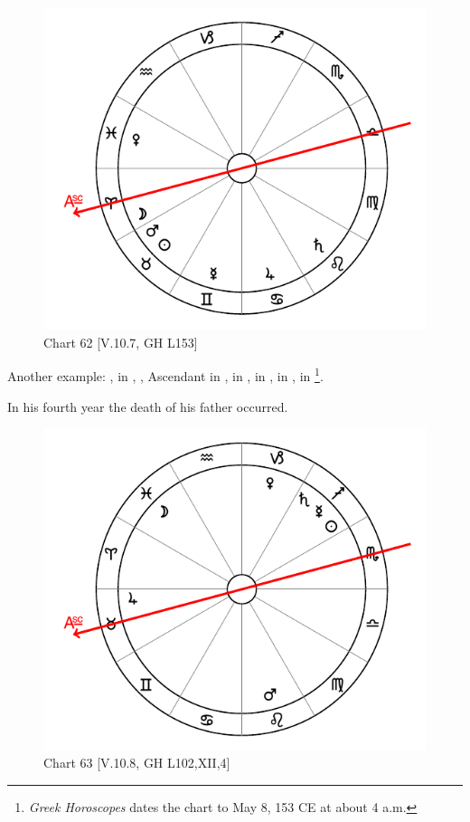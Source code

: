 \newpage
\begin{figure}
\centering
\vspace{-20pt}
\includegraphics[width=.68\textwidth]{charts/5_10_07}
\caption{Chart 62 [V.10.7, GH L153]}
\label{fig:chart62}
\end{figure}

\noindent Another example: \Sun, \Mars\xspace in \Taurus, \Moon, Ascendant in \Aries, \Saturn\xspace in \Leo, \Jupiter\xspace in \Cancer, \Venus\xspace in \Pisces, \Mercury\xspace in \Gemini\footnote{\textit{Greek Horoscopes} dates the chart to May 8, 153 CE at about 4 a.m.}. 

In his fourth year the death of his father occurred.

\vspace{1.2cm}

\begin{figure}
\centering
\vspace{-20pt}
\includegraphics[width=.68\textwidth]{charts/5_10_08}
\caption{Chart 63 [V.10.8, GH L102,XII,4]}
\label{fig:chart63}
\end{figure}


